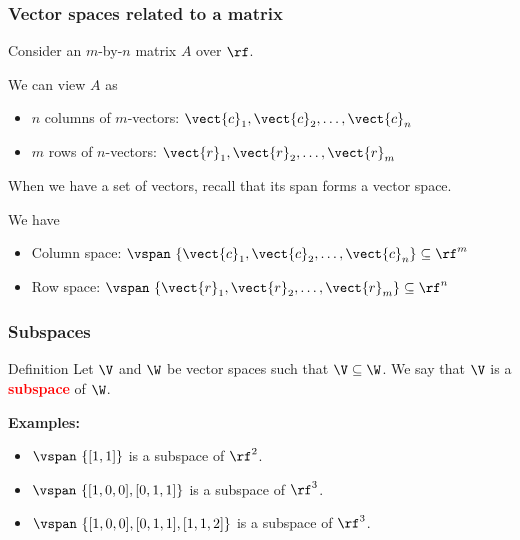 \begin{frame}
  \frametitle{Vector spaces related to a matrix}

  Consider an $m$-by-$n$ matrix $A$ over $\rf$.

  \pause
  We can view $A$ as
  \begin{itemize}
  \item $n$ columns of $m$-vectors:
  $\vect{c}_1,\vect{c}_2,\ldots,\vect{c}_n$     
  \pause
  \item $m$ rows of $n$-vectors:
  $\vect{r}_1,\vect{r}_2,\ldots,\vect{r}_m$
  \end{itemize}

  \pause When we have a set of vectors, recall that its span forms a
  vector space.

  \vspace{0.2in}
  
  We have
  \pause
  \begin{itemize}
  \item Column space: $\vspan~\{\vect{c}_1,\vect{c}_2,\ldots,\vect{c}_n\} \subseteq \rf^{m}$     
    \pause
  \item Row space: $\vspan~\{\vect{r}_1,\vect{r}_2,\ldots,\vect{r}_m\} \subseteq \rf^{n}$
  \end{itemize}
\end{frame}

\begin{frame}
  \frametitle{Subspaces}

  \begin{block}{Definition}
    Let $\V$ and $\W$ be vector spaces such that $\V\subseteq\W$.  We
    say that $\V$ is a \textcolor{red}{\bf subspace} of $\W$.
  \end{block}

  \pause

  {\bf Examples:}
  \begin{itemize}
  \item $\vspan~\{[1,1]\}$ is a subspace of $\rf^2$.
  \item $\vspan~\{[1,0,0],[0,1,1]\}$ is a subspace of $\rf^3$.
  \item $\vspan~\{[1,0,0],[0,1,1],[1,1,2]\}$ is a subspace of $\rf^3$.
  \end{itemize}
\end{frame}

